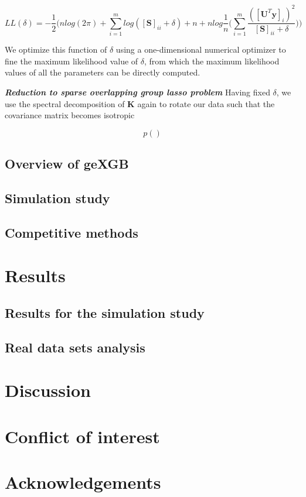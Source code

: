 \documentclass[11pt]{article}
\theoremstyle{plain}
\theoremstyle{definition}
\theoremstyle{remark}
\begin{document}
\begin{equation*}
LL(\delta)=-\frac{1}{2}\Bigg(nlog(2\pi)+\sum_{i=1}^mlog([\bm{S}]_{ii}+\delta)+n+nlog\frac{1}{n}\bigg(\sum_{i=1}^m\frac{([\bm{U}^T\bm{y}]_i)^2}{[\bm{S}]_{ii}+\delta}\bigg)\Bigg)
\end{equation*}

We optimize this function of $\delta$ using a one-dimensional numerical optimizer to fine the maximum likelihood value of $\delta$, from which the maximum likelihood values of all the parameters can be directly computed.

\textbf{\em Reduction to sparse overlapping group lasso problem} Having fixed $\delta$, we use the spectral decomposition of $\bm{K}$ again to rotate our data such that the covariance matrix becomes isotropic

\begin{equation}
p()
\end{equation}

\subsection{Overview of geXGB}






\subsection{Simulation study}



\subsection{Competitive methods}


\section{Results}

\subsection{Results for the simulation study}


\subsection{Real data sets analysis}


\section{Discussion}



\section{Conflict of interest}

\section{Acknowledgements}

\begin{thebibliography}{99}


\end{thebibliography}
\end{document}
